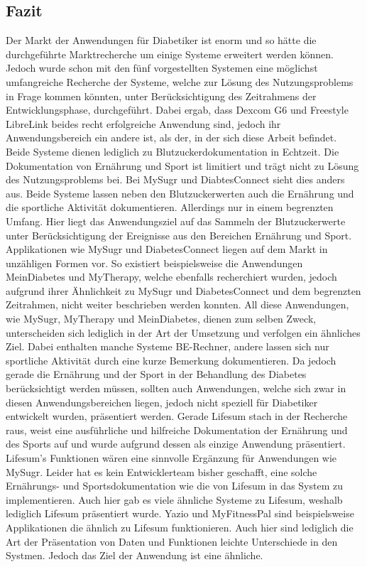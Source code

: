 \documentclass[a4paper,11pt]{article}%
\renewcommand{\\}{\vspace*{0.5\baselineskip} \newline}
\begin{document}
	\subsection{Fazit}
	Der Markt der Anwendungen für Diabetiker ist enorm und so hätte die durchgeführte Marktrecherche um einige Systeme erweitert werden können. Jedoch wurde schon mit den fünf vorgestellten Systemen eine möglichst umfangreiche Recherche der Systeme, welche zur Lösung des Nutzungsproblems in Frage kommen könnten, unter Berücksichtigung des Zeitrahmens der Entwicklungsphase, durchgeführt. Dabei ergab, dass Dexcom G6 und Freestyle LibreLink beides recht erfolgreiche Anwendung sind, jedoch ihr Anwendungsbereich ein andere ist, als der, in der sich diese Arbeit befindet. Beide Systeme dienen lediglich zu Blutzuckerdokumentation in Echtzeit. Die Dokumentation von Ernährung und Sport ist limitiert und trägt nicht zu Lösung des Nutzungsproblems bei. Bei MySugr und DiabtesConnect sieht dies anders aus. Beide Systeme lassen neben den Blutzuckerwerten auch die Ernährung und die sportliche Aktivität dokumentieren. Allerdings nur in einem begrenzten Umfang. Hier liegt das Anwendungsziel auf das Sammeln der Blutzuckerwerte unter Berücksichtigung der Ereignisse aus den Bereichen Ernährung und Sport. Applikationen wie MySugr und DiabetesConnect liegen auf dem Markt in unzähligen Formen vor. So existiert beispielsweise die Anwendungen MeinDiabetes und MyTherapy, welche ebenfalls recherchiert wurden, jedoch aufgrund ihrer Ähnlichkeit zu MySugr und DiabetesConnect und dem begrenzten Zeitrahmen, nicht weiter beschrieben werden konnten. All diese Anwendungen, wie MySugr, MyTherapy und MeinDiabetes, dienen zum selben Zweck, unterscheiden sich lediglich in der Art der Umsetzung und verfolgen ein ähnliches Ziel. Dabei enthalten manche Systeme BE-Rechner, andere lassen sich nur sportliche Aktivität durch eine kurze Bemerkung dokumentieren. Da jedoch gerade die Ernährung und der Sport in der Behandlung des Diabetes berücksichtigt werden müssen, sollten auch Anwendungen, welche sich zwar in diesen Anwendungsbereichen liegen, jedoch nicht speziell für Diabetiker entwickelt wurden, präsentiert werden. Gerade Lifesum stach in der Recherche raus, weist eine ausführliche und hilfreiche Dokumentation der Ernährung und des Sports auf und wurde aufgrund dessen als einzige Anwendung präsentiert. Lifesum’s Funktionen wären eine sinnvolle Ergänzung für Anwendungen wie MySugr. Leider hat es kein Entwicklerteam bisher geschafft, eine solche Ernährungs- und Sportsdokumentation wie die von Lifesum in das System zu implementieren. Auch hier gab es viele ähnliche Systeme zu Lifesum, weshalb lediglich Lifesum präsentiert wurde. Yazio und MyFitnessPal sind beispielsweise Applikationen die ähnlich zu Lifesum funktionieren. Auch hier sind lediglich die Art der Präsentation von Daten und Funktionen leichte Unterschiede in den Systmen. Jedoch das Ziel der Anwendung ist eine ähnliche. \newline
\end{document}
